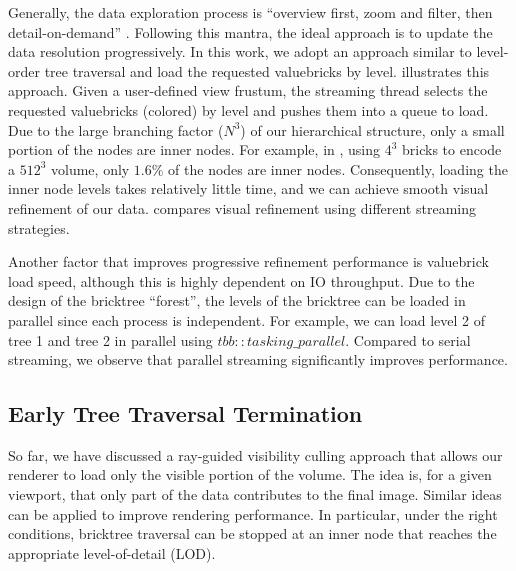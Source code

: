 Generally, the data exploration process is ``overview first, zoom and filter, then detail-on-demand''
\cite{ferster2012interactive,wang2018association}. 
Following this mantra, 
the ideal approach is to update the data resolution progressively. 
In this work, we adopt an approach similar
to level-order tree traversal and load the requested valuebricks by level. 
illustrates this approach. Given a user-defined view frustum, the streaming thread
selects the requested valuebricks (colored) by level and pushes them into a queue to load. Due to
the large branching factor ($N^3$) of our hierarchical structure, only a small portion of the
nodes are inner nodes. For example, in , using $4^3$ bricks to encode a
$512^3$ volume, only $1.6\%$ of the nodes are inner nodes. Consequently, loading the inner node levels
takes relatively little time, and we can achieve smooth visual refinement of our data. 
 compares visual refinement using different streaming strategies.




Another factor that improves progressive refinement performance is valuebrick load speed,
although this is highly dependent on IO throughput. Due to the design of the bricktree ``forest'', 
the levels of the bricktree can be loaded in parallel since each process is independent.
For example, we can load level 2 of tree 1 and tree 2 in parallel using $tbb::tasking\_parallel$. 
Compared to serial streaming, we observe that parallel streaming significantly improves performance. 


\subsection{Early Tree Traversal Termination}
So far, we have discussed a ray-guided visibility culling approach that allows our renderer
to load only the visible portion of the volume. The idea is, for a given viewport, that only part of the data
contributes to the final image. Similar ideas can be applied to improve 
rendering performance. In particular, under the right conditions, bricktree traversal
can be stopped at an inner node that reaches the appropriate level-of-detail (LOD). 

